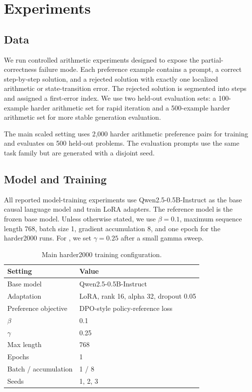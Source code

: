 \section{Experiments}

\subsection{Data}

We run controlled arithmetic experiments designed to expose the partial-correctness failure mode. Each preference example contains a prompt, a correct step-by-step solution, and a rejected solution with exactly one localized arithmetic or state-transition error. The rejected solution is segmented into steps and assigned a first-error index. We use two held-out evaluation sets: a 100-example harder arithmetic set for rapid iteration and a 500-example harder arithmetic set for more stable generation evaluation.

The main scaled setting uses 2,000 harder arithmetic preference pairs for training and evaluates on 500 held-out problems. The evaluation prompts use the same task family but are generated with a disjoint seed.

\subsection{Model and Training}

All reported model-training experiments use Qwen2.5-0.5B-Instruct as the base causal language model and train LoRA adapters. The reference model is the frozen base model. Unless otherwise stated, we use $\beta=0.1$, maximum sequence length 768, batch size 1, gradient accumulation 8, and one epoch for the harder2000 runs. For \cmdpo, we set $\gamma=0.25$ after a small gamma sweep.

\begin{table}[t]
\caption{Main harder2000 training configuration.}
\label{tab:training-config}
\begin{center}
\begin{tabular}{ll}
\toprule
Setting & Value \\
\midrule
Base model & Qwen2.5-0.5B-Instruct \\
Adaptation & LoRA, rank 16, alpha 32, dropout 0.05 \\
Preference objective & DPO-style policy-reference loss \\
$\beta$ & 0.1 \\
\cmdpo{} $\gamma$ & 0.25 \\
Max length & 768 \\
Epochs & 1 \\
Batch / accumulation & 1 / 8 \\
Seeds & 1, 2, 3 \\
\bottomrule
\end{tabular}
\end{center}
\end{table}

